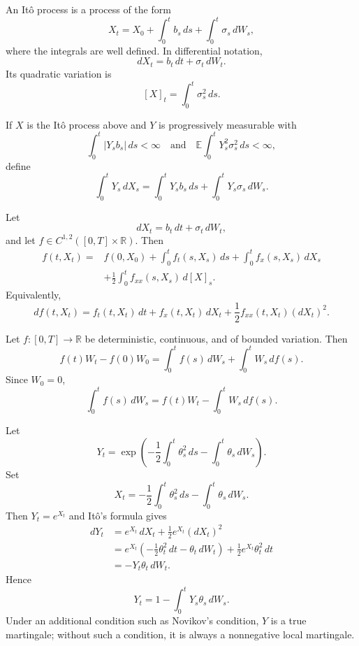 \begin{de}
An It\^o process is a process of the form
\[
X_t
=
X_0+
\int_0^t b_s\,ds+
\int_0^t\sigma_s\,dW_s,
\]
where the integrals are well defined. In differential notation,
\[
dX_t=b_t\,dt+\sigma_t\,dW_t.
\]
Its quadratic variation is
\[
[X]_t=\int_0^t\sigma_s^2\,ds.
\]
\end{de}

\begin{de}
If $X$ is the It\^o process above and $Y$ is progressively measurable with
\[
\int_0^t|Y_sb_s|\,ds<\infty
\quad\text{and}\quad
\mathbb{E}\int_0^tY_s^2\sigma_s^2\,ds<\infty,
\]
define
\[
\int_0^tY_s\,dX_s
=
\int_0^tY_sb_s\,ds+
\int_0^tY_s\sigma_s\,dW_s.
\]
\end{de}

\begin{thm}[It\^o's formula]
Let
\[
dX_t=b_t\,dt+\sigma_t\,dW_t,
\]
and let $f\in C^{1,2}([0,T]\times\mathbb{R})$. Then
\[
\begin{aligned}
f(t,X_t)
={}&f(0,X_0)
+\int_0^t f_t(s,X_s)\,ds
+\int_0^t f_x(s,X_s)\,dX_s\\
&+\frac12\int_0^t f_{xx}(s,X_s)\,d[X]_s.
\end{aligned}
\]
Equivalently,
\[
df(t,X_t)
=
f_t(t,X_t)\,dt
+f_x(t,X_t)\,dX_t
+\frac12f_{xx}(t,X_t)(dX_t)^2.
\]
\end{thm}

\begin{thm}
Let $f:[0,T]\to\mathbb{R}$ be deterministic, continuous, and of bounded variation. Then
\[
f(t)W_t-f(0)W_0
=
\int_0^t f(s)\,dW_s+
\int_0^t W_s\,df(s).
\]
Since $W_0=0$,
\[
\int_0^t f(s)\,dW_s
=
f(t)W_t-
\int_0^t W_s\,df(s).
\]
\end{thm}

\begin{eg}
Let
\[
Y_t
=
\exp\left(
-\frac12\int_0^t\theta_s^2\,ds
-\int_0^t\theta_s\,dW_s
\right).
\]
Set
\[
X_t
=-\frac12\int_0^t\theta_s^2\,ds
-\int_0^t\theta_s\,dW_s.
\]
Then $Y_t=e^{X_t}$ and It\^o's formula gives
\[
\begin{aligned}
dY_t
&=e^{X_t}\,dX_t+\frac12e^{X_t}(dX_t)^2\\
&=e^{X_t}\left(-\frac12\theta_t^2\,dt-\theta_t\,dW_t\right)
+\frac12e^{X_t}\theta_t^2\,dt\\
&=-Y_t\theta_t\,dW_t.
\end{aligned}
\]
Hence
\[
Y_t=1-\int_0^tY_s\theta_s\,dW_s.
\]
Under an additional condition such as Novikov's condition, $Y$ is a true martingale; without such a condition, it is always a nonnegative local martingale.
\end{eg}

